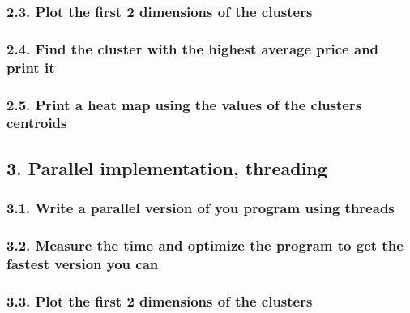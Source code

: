 \documentclass[
]{article}
\begin{document}
\hypertarget{plot-the-first-2-dimensions-of-the-clusters-1}{%
\subsubsection{2.3. Plot the first 2 dimensions of the
clusters}\label{plot-the-first-2-dimensions-of-the-clusters-1}}

\hypertarget{find-the-cluster-with-the-highest-average-price-and-print-it-1}{%
\subsubsection{2.4. Find the cluster with the highest average price and
print
it}\label{find-the-cluster-with-the-highest-average-price-and-print-it-1}}

\hypertarget{print-a-heat-map-using-the-values-of-the-clusters-centroids-1}{%
\subsubsection{2.5. Print a heat map using the values of the clusters
centroids}\label{print-a-heat-map-using-the-values-of-the-clusters-centroids-1}}

\hypertarget{parallel-implementation-threading}{%
\subsection{3. Parallel implementation,
threading}\label{parallel-implementation-threading}}

\hypertarget{write-a-parallel-version-of-you-program-using-threads}{%
\subsubsection{3.1. Write a parallel version of you program using
threads}\label{write-a-parallel-version-of-you-program-using-threads}}

\hypertarget{measure-the-time-and-optimize-the-program-to-get-the-fastest-version-you-can-1}{%
\subsubsection{3.2. Measure the time and optimize the program to get the
fastest version you
can}\label{measure-the-time-and-optimize-the-program-to-get-the-fastest-version-you-can-1}}

\hypertarget{plot-the-first-2-dimensions-of-the-clusters-2}{%
\subsubsection{3.3. Plot the first 2 dimensions of the
clusters}\label{plot-the-first-2-dimensions-of-the-clusters-2}}
\end{document}
